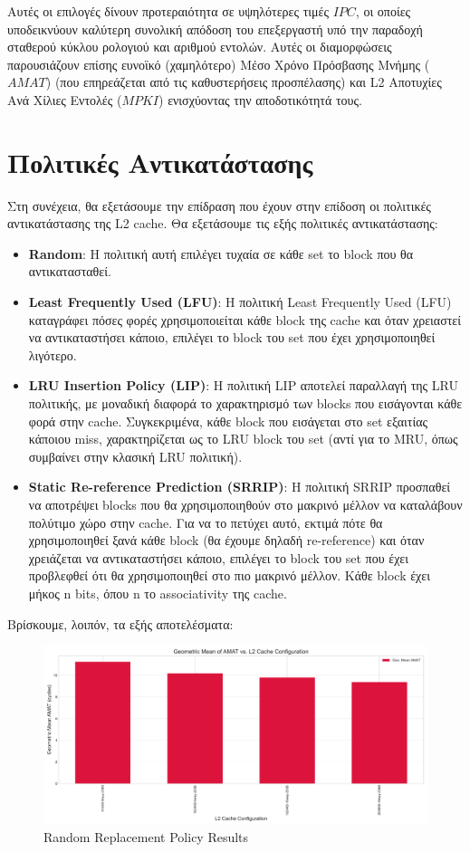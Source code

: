 \documentclass{article}
\begin{document}
Αυτές οι επιλογές δίνουν προτεραιότητα σε υψηλότερες τιμές $IPC$, οι οποίες υποδεικνύουν καλύτερη συνολική απόδοση του επεξεργαστή υπό την παραδοχή σταθερού κύκλου ρολογιού και αριθμού εντολών. 
Αυτές οι διαμορφώσεις παρουσιάζουν επίσης ευνοϊκό (χαμηλότερο) Μέσο Χρόνο Πρόσβασης Μνήμης ($AMAT$) (που επηρεάζεται από τις καθυστερήσεις προσπέλασης) και L2 Αποτυχίες Ανά Χίλιες Εντολές ($MPKI$) ενισχύοντας την αποδοτικότητά τους. 

\section{Πολιτικές Αντικατάστασης}
Στη συνέχεια, θα εξετάσουμε την επίδραση που έχουν στην επίδοση οι πολιτικές αντικατάστασης της L2 cache.
Θα εξετάσουμε τις εξής πολιτικές αντικατάστασης:
\begin{itemize}
    \item \textbf{Random}: Η πολιτική αυτή επιλέγει τυχαία σε κάθε set το block που θα αντικατασταθεί.
    \item \textbf{Least Frequently Used (LFU)}: Η πολιτική Least Frequently Used (LFU) καταγράφει πόσες φορές χρησιμοποιείται κάθε block της cache και όταν χρειαστεί να αντικαταστήσει κάποιο, επιλέγει το block του set που έχει χρησιμοποιηθεί λιγότερο.
    \item \textbf{LRU Insertion Policy (LIP)}: Η πολιτική LIP αποτελεί παραλλαγή της LRU πολιτικής, με μοναδική διαφορά το χαρακτηρισμό των blocks που εισάγονται κάθε φορά στην cache. Συγκεκριμένα, κάθε block που εισάγεται στο set εξαιτίας κάποιου miss, χαρακτηρίζεται ως το LRU block του set (αντί για το MRU, όπως συμβαίνει στην κλασική LRU πολιτική).
    \item \textbf{Static Re-reference Prediction (SRRIP)}: Η πολιτική SRRIP προσπαθεί να αποτρέψει blocks που θα χρησιμοποιηθούν στο μακρινό μέλλον να καταλάβουν πολύτιμο χώρο στην cache. Για να το πετύχει αυτό, εκτιμά πότε θα χρησιμοποιηθεί ξανά κάθε block (θα έχουμε δηλαδή re-reference) και όταν χρειάζεται να αντικαταστήσει κάποιο, επιλέγει το block του set που έχει προβλεφθεί ότι θα χρησιμοποιηθεί στο πιο μακρινό μέλλον. Κάθε block έχει μήκος n bits, όπου n το associativity της cache.
\end{itemize}

Βρίσκουμε, λοιπόν, τα εξής αποτελέσματα:

\begin{figure}[H]
    \centering
    \includegraphics[width=\textwidth]{figures/random/amat_random.png}
    \caption{Random Replacement Policy Results}
    \label{fig:random_amat}
\end{figure}
\end{document}

